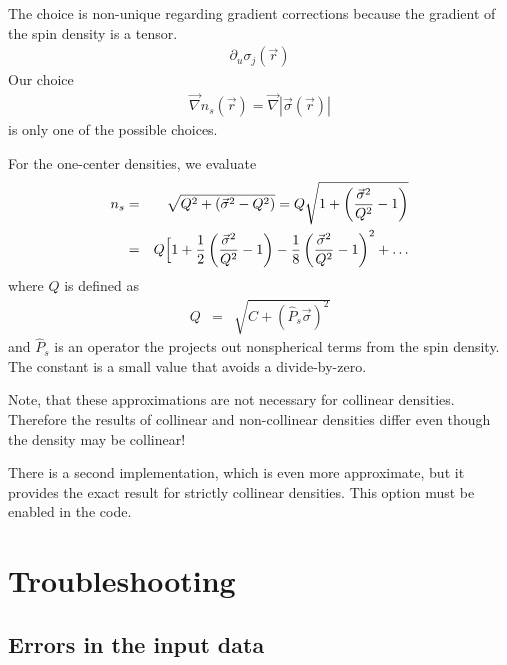 \documentclass[final,12pt]{article}
\begin{document}
{{{{{{The choice is non-unique regarding gradient corrections because the
gradient of the spin density is a tensor.
\begin{eqnarray*}
\partial_u\sigma_j(\vec{r})
\end{eqnarray*}
Our choice
\begin{eqnarray*}
\vec{\nabla}n_s(\vec{r})=\vec{\nabla}|\vec{\sigma}(\vec{r})|
\end{eqnarray*}
is only one of the possible choices. 


For the one-center densities, we evaluate
\begin{eqnarray*}
n_s&=&\sqrt{Q^2+\left(\vec{\sigma}^2-Q^2\right)}
=Q\sqrt{1+\left(\frac{\vec{\sigma}^2}{Q^2}-1\right)}
\\
&=&Q\Bigl[1+\frac{1}{2}\left(\frac{\vec{\sigma}^2}{Q^2}-1\right)
-\frac{1}{8}\left(\frac{\vec{\sigma}^2}{Q^2}-1\right)^2+\ldots
\end{eqnarray*}
where $Q$ is defined as
\begin{eqnarray*}
Q&=&\sqrt{C+(\hat{P}_s\vec{\sigma})^2}
\end{eqnarray*}
and $\hat{P}_s$ is an operator the projects out nonspherical terms
from the spin density. The constant is a small value that avoids a 
divide-by-zero.

Note, that these approximations are not necessary for collinear
densities. Therefore the results of collinear and non-collinear
densities differ even though the density may be collinear!

There is a second implementation, which is even more approximate, but
it provides the exact result for strictly collinear densities. This
option must be enabled in the code.




\newpage
\section{Troubleshooting}

\subsection{Errors in the input data}

}}}}}}
\end{document}
